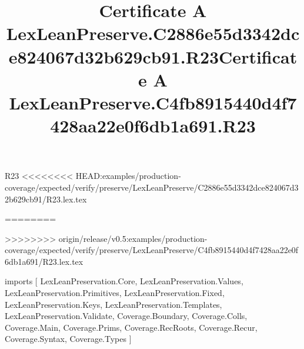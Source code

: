 \begin{lexlean}{R23}
<<<<<<<< HEAD:examples/production-coverage/expected/verify/preserve/LexLeanPreserve/C2886e55d3342dce824067d32b629cb91/R23.lex.tex
\title{Certificate A LexLeanPreserve.C2886e55d3342dce824067d32b629cb91.R23}
========
\title{Certificate A LexLeanPreserve.C4fb8915440d4f7428aa22e0f6db1a691.R23}
>>>>>>>> origin/release/v0.5:examples/production-coverage/expected/verify/preserve/LexLeanPreserve/C4fb8915440d4f7428aa22e0f6db1a691/R23.lex.tex
\begin{coremodule}
imports [
  LexLeanPreservation.Core,
  LexLeanPreservation.Values,
  LexLeanPreservation.Primitives,
  LexLeanPreservation.Fixed,
  LexLeanPreservation.Keys,
  LexLeanPreservation.Templates,
  LexLeanPreservation.Validate,
  Coverage.Boundary,
  Coverage.Colls,
  Coverage.Main,
  Coverage.Prims,
  Coverage.RecRoots,
  Coverage.Recur,
  Coverage.Syntax,
  Coverage.Types
]


\end{coremodule}
\end{lexlean}
